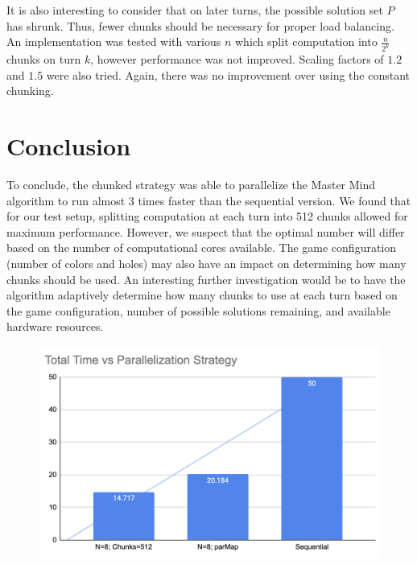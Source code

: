\documentclass{article}
\begin{document}
It is also interesting to consider that on later turns, the possible solution set $P$ has shrunk. Thus, fewer chunks should be necessary for proper load balancing. An implementation was tested with various $n$ which split computation into $\frac{n}{2^k}$ chunks on turn $k$, however performance was not improved. Scaling factors of $1.2$ and $1.5$ were also tried. Again, there was no improvement over using the constant chunking.


\section{Conclusion}
To conclude, the chunked strategy was able to parallelize the Master Mind algorithm to run almost 3 times faster than the sequential version. We found that for our test setup, splitting computation at each turn into 512 chunks allowed for maximum performance. However, we suspect that the optimal number will differ based on the number of computational cores available. The game configuration (number of colors and holes) may also have an impact on determining how many chunks should be used. An interesting further investigation would be to have the algorithm adaptively determine how many chunks to use at each turn based on the game configuration, number of possible solutions remaining, and available hardware resources.

\begin{figure}[H]
	\centering
	\includegraphics[width=40em]{../images/bar_sum.png}
\end{figure}
\end{document}
